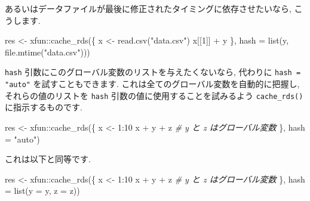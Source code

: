 \documentclass[
  11pt,
]{bxjsreport}
\newenvironment{Shaded}{\begin{snugshade}}{\end{snugshade}}
\newcommand{\AttributeTok}[1]{\textcolor[rgb]{0.77,0.63,0.00}{#1}}
\newcommand{\CommentTok}[1]{\textcolor[rgb]{0.56,0.35,0.01}{\textit{#1}}}
\newcommand{\DecValTok}[1]{\textcolor[rgb]{0.00,0.00,0.81}{#1}}
\newcommand{\FunctionTok}[1]{\textcolor[rgb]{0.00,0.00,0.00}{#1}}
\newcommand{\NormalTok}[1]{#1}
\newcommand{\OtherTok}[1]{\textcolor[rgb]{0.56,0.35,0.01}{#1}}
\newcommand{\SpecialCharTok}[1]{\textcolor[rgb]{0.00,0.00,0.00}{#1}}
\newcommand{\StringTok}[1]{\textcolor[rgb]{0.31,0.60,0.02}{#1}}
\begin{document}
あるいはデータファイルが最後に修正されたタイミングに依存させたいなら, こうします.

\begin{Shaded}
\begin{Highlighting}[]
\NormalTok{res }\OtherTok{\textless{}{-}}\NormalTok{ xfun}\SpecialCharTok{::}\FunctionTok{cache\_rds}\NormalTok{(\{}
\NormalTok{  x }\OtherTok{\textless{}{-}} \FunctionTok{read.csv}\NormalTok{(}\StringTok{"data.csv"}\NormalTok{)}
\NormalTok{  x[[}\DecValTok{1}\NormalTok{]] }\SpecialCharTok{+}\NormalTok{ y}
\NormalTok{\}, }\AttributeTok{hash =} \FunctionTok{list}\NormalTok{(y, }\FunctionTok{file.mtime}\NormalTok{(}\StringTok{"data.csv"}\NormalTok{)))}
\end{Highlighting}
\end{Shaded}

\texttt{hash} 引数にこのグローバル変数のリストを与えたくないなら, 代わりに \texttt{hash = "auto"} を試すこともできます. これは全てのグローバル変数を自動的に把握し, それらの値のリストを \texttt{hash} 引数の値に使用することを試みるよう \texttt{cache\_rds()} に指示するものです.

\begin{Shaded}
\begin{Highlighting}[]
\NormalTok{res }\OtherTok{\textless{}{-}}\NormalTok{ xfun}\SpecialCharTok{::}\FunctionTok{cache\_rds}\NormalTok{(\{}
\NormalTok{  x }\OtherTok{\textless{}{-}} \DecValTok{1}\SpecialCharTok{:}\DecValTok{10}
\NormalTok{  x }\SpecialCharTok{+}\NormalTok{ y }\SpecialCharTok{+}\NormalTok{ z  }\CommentTok{\# y と z はグローバル変数}
\NormalTok{\}, }\AttributeTok{hash =} \StringTok{"auto"}\NormalTok{)}
\end{Highlighting}
\end{Shaded}

これは以下と同等です.

\begin{Shaded}
\begin{Highlighting}[]
\NormalTok{res }\OtherTok{\textless{}{-}}\NormalTok{ xfun}\SpecialCharTok{::}\FunctionTok{cache\_rds}\NormalTok{(\{}
\NormalTok{  x }\OtherTok{\textless{}{-}} \DecValTok{1}\SpecialCharTok{:}\DecValTok{10}
\NormalTok{  x }\SpecialCharTok{+}\NormalTok{ y }\SpecialCharTok{+}\NormalTok{ z  }\CommentTok{\# y と z はグローバル変数}
\NormalTok{\}, }\AttributeTok{hash =} \FunctionTok{list}\NormalTok{(}\AttributeTok{y =}\NormalTok{ y, }\AttributeTok{z =}\NormalTok{ z))}
\end{Highlighting}
\end{Shaded}
\end{document}
